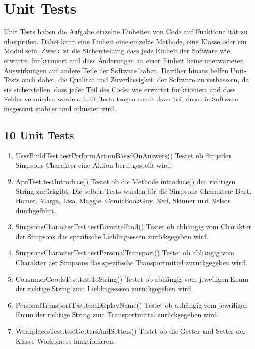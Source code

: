 \chapter{Unit Tests}
Unit Tests haben die Aufgabe einzelne Einheiten von Code auf Funktionalität zu überprüfen. Dabei kann eine Einheit eine einzelne Methode, eine Klasse oder ein Modul sein. Zweck ist die Sicherstellung dass jede Einheit der Software wie erwartet funktioniert und dass Änderungen an einer Einheit keine unerwarteten Auswirkungen auf andere Teile der Software haben. Darüber hinaus helfen Unit-Tests auch dabei, die Qualität und Zuverlässigkeit der Software zu verbessern, da sie sicherstellen, dass jeder Teil des Codes wie erwartet funktioniert und dass Fehler vermieden werden. Unit-Tests tragen somit dazu bei, dass die Software insgesamt stabiler und robuster wird.
\section{10 Unit Tests}
\begin{enumerate}
    \item UserBuildTest.testPerformActionBasedOnAnswers() Testet ob für jeden Simpsons Charakter eine Aktion bereitgestellt wird.
    \item ApuTest.testIntroduce() Testet ob die Methode introduce() den richtigen String zurückgibt. Die selben Tests wurden für die Simpsons Charaktere Bart, Homer, Marge, Lisa, Maggie, ComicBookGuy, Ned, Skinner und Nelson durchgeführt.
    \item SimpsonsCharacterTest.testFavoriteFood() Testet ob abhängig vom Charakter der Simpsons das spezifische Lieblingsessen zurückgegeben wird.
    \item SimpsonsCharacterTest.testPersonalTransport() Testet ob abhängig vom Charakter der Simpsons das spezifische Transportmittel zurückgegeben wird.
    \item ConsumerGoodsTest.testToString() Testet ob abhängig vom jeweiligen Enum der richtige String zum Lieblingsessen zurückgegeben wird.
    \item PersonalTransportTest.testDisplayName() Testet ob abhängig vom jeweiligen Enum der richtige String zum Transportmittel zurückgegeben wird.
    \item WorkplacesTest.testGettersAndSetters() Testet ob die Getter und Setter der Klasse Workplaces funktionieren.
\end{enumerate}

